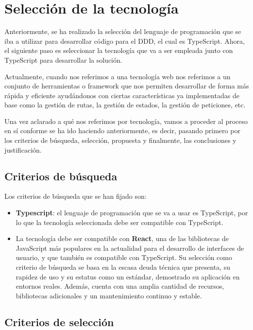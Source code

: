 \section{Selección de la tecnología}

Anteriormente, se ha realizado la selección del lenguaje de programación que se iba a utilizar para desarrollar código para el DDD, el cual es TypeScript. Ahora, el siguiente paso es seleccionar la tecnología que va a ser empleada junto con TypeScript para desarrollar la solución.

Actualmente, cuando nos referimos a una tecnología web nos referimos a un conjunto de herramientas o framework que nos permiten desarrollar de forma más rápida y eficiente ayudándonos con ciertas características ya implementadas de base como la gestión de rutas, la gestión de estados, la gestión de peticiones, etc.

Una vez aclarado a qué nos referimos por tecnología, vamos a proceder al proceso en sí conforme se ha ido haciendo anteriormente, es decir, pasando primero por los criterios de búsqueda, selección, propuesta y finalmente, las conclusiones y justificación.

\subsection{Criterios de búsqueda}

Los criterios de búsqueda que se han fijado son:

\begin{itemize}
  \item \textbf{Typescript}: el lenguaje de programación que se va a usar es TypeScript, por lo que la tecnología seleccionada debe ser compatible con TypeScript.
  \item La tecnología debe ser compatible con \textbf{React}, una de las bibliotecas de JavaScript más populares en la actualidad para el desarrollo de interfaces de usuario, y que también es compatible con TypeScript. Su selección como criterio de búsqueda se basa en la escasa deuda técnica que presenta, su rapidez de uso y su estatus como un estándar, demostrado su aplicación en entornos reales. Además, cuenta con una amplia cantidad de recursos, bibliotecas adicionales y un mantenimiento continuo y estable.
\end{itemize}

\subsection{Criterios de selección}

